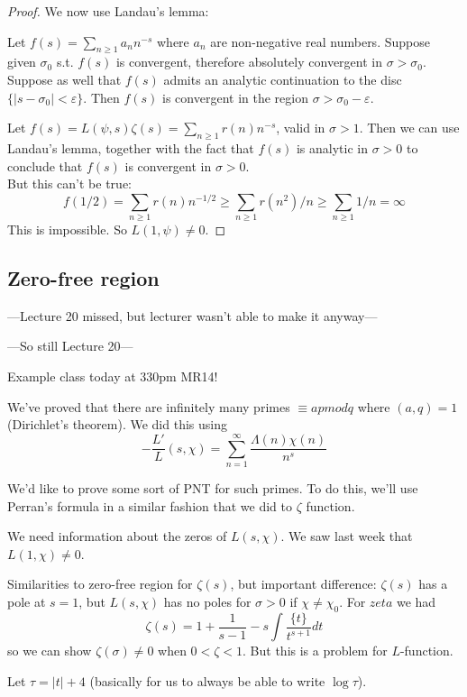 \documentclass[a4paper]{article}
\begin{document}
\begin{thm}
\begin{proof}
We now use Landau's lemma:
\begin{lemma}
Let $f(s) = \sum_{n \geq 1} a_n n^{-s}$ where $a_n$ are non-negative real numbers. Suppose given $\sigma_0$ s.t. $f(s)$ is convergent, therefore absolutely convergent in $\sigma > \sigma_0$. Suppose as well that $f(s)$ admits an analytic continuation to the disc $\{|s-\sigma_0| < \varepsilon\}$. Then $f(s)$ is convergent in the region $\sigma>\sigma_0-\varepsilon$.
\end{lemma}

Let $f(s) = L(\psi,s) \zeta(s) = \sum_{n \geq 1} r(n) n^{-s}$, valid in $\sigma>1$. Then we can use Landau's lemma, together with the fact that $f(s)$ is analytic in $\sigma>0$ to conclude that $f(s)$ is convergent in $\sigma>0$.\\
But this can't be true: 
\[
f(1/2) = \sum_{n \geq 1} r(n) n^{-1/2} \geq \sum_{n \geq 1} r(n^2)/n \geq \sum_{n \geq 1} 1/n = \infty
\]
This is impossible. So $L(1,\psi) \neq 0$.
\end{proof}
\end{thm}

\subsection{Zero-free region}

---Lecture 20 missed, but lecturer wasn't able to make it anyway---

---So still Lecture 20---

Example class today at 330pm MR14!

We've proved that there are infinitely many primes $\equiv a pmod q$ where $(a,q)=1$ (Dirichlet's theorem). We did this using
\[
-\frac{L'}{L}(s,\chi) = \sum_{n=1}^\infty \frac{\Lambda(n)\chi(n)}{n^s}
\]

We'd like to prove some sort of PNT for such primes. To do this, we'll use Perran's formula in a similar fashion that we did to $\zeta$ function. 

We need information about the zeros of $L(s,\chi)$. We saw last week that $L(1,\chi) \neq 0$.

Similarities to zero-free region for $\zeta(s)$, but important difference: $\zeta(s)$ has a pole at $s=1$, but $L(s,\chi)$ has no poles for $\sigma>0$ if $\chi \neq \chi_0$. For $zeta$ we had
\[
\zeta(s) = 1+\frac{1}{s-1} - s\int\frac{\{t\}}{t^{s+1}} dt
\]
so we can show $\zeta(\sigma) \neq 0$ when $0 < \zeta < 1$. But this is a problem for $L$-function.

Let $\tau = |t|+4$ (basically for us to always be able to write $\log \tau$).
\end{document}
